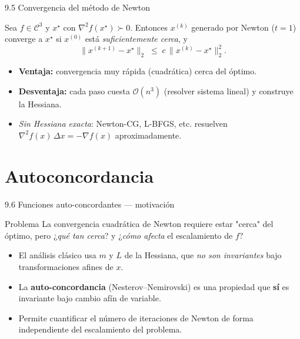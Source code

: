 \documentclass[10pt,aspectratio=169]{beamer}
\newcommand{\Hess}{\nabla^{2} f}
\begin{document}
\begin{frame}{9.5 Convergencia del método de Newton}
  \begin{theorem}
    Sea $f \in \mathcal{C}^{3}$ y $x^{\star}$ con $\Hess(x^{\star}) \succ 0$.
    Entonces $x^{(k)}$ generado por Newton ($t = 1$) converge a $x^{\star}$ si
    $x^{(0)}$ está \emph{suficientemente cerca}, y
    \[
      \|x^{(k+1)} - x^{\star}\|_{2} \;\le\; c\,\|x^{(k)} - x^{\star}\|_{2}^{2}.
    \]
  \end{theorem}
  \begin{itemize}
    \item \textbf{Ventaja:} convergencia muy rápida (cuadrática) cerca del óptimo.
    \item \textbf{Desventaja:} cada paso cuesta $\mathcal{O}(n^{3})$ (resolver sistema
          lineal) y construye la Hessiana.
    \item \emph{Sin Hessiana exacta}: Newton-CG, L-BFGS, etc. resuelven
          $\Hess(x)\, \Delta x = -\nabla f(x)$ aproximadamente.
  \end{itemize}
\end{frame}

\section{Autoconcordancia}
\begin{frame}{9.6 Funciones auto-concordantes --- motivación}
  \begin{block}{Problema}
    La convergencia cuadrática de Newton requiere estar "cerca" del óptimo, pero
    ¿\emph{qué tan cerca}? y ¿\emph{cómo afecta} el escalamiento de $f$?
  \end{block}
  \begin{itemize}
    \item El análisis clásico usa $m$ y $L$ de la Hessiana, que \emph{no son invariantes}
          bajo transformaciones afines de $x$.
    \item La \textbf{auto-concordancia} (Nesterov--Nemirovski) es una propiedad que
          \textbf{sí} es invariante bajo cambio afín de variable.
    \item Permite cuantificar el número de iteraciones de Newton de forma
          independiente del escalamiento del problema.
  \end{itemize}
\end{frame}
\end{document}

